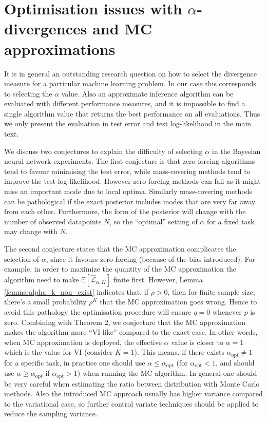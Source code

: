 \section{Optimisation issues with $\alpha$-divergences and MC approximations}
\label{sec:opt}

It is in general an outstanding research question on how to select the divergence measure for a particular machine learning problem. In our case this corresponds to selecting the $\alpha$ value. Also an approximate inference algorithm can be evaluated with different performance measures, and it is impossible to find a single algorithm value that returns the best performance on all evaluations. Thus we only present the evaluation in test error and test log-likelihood in the main text. 

We discuss two conjectures to explain the difficulty of selecting $\alpha$ in the Bayesian neural network experiments. The first conjecture is that zero-forcing algorithms tend to favour minimising the test error, while mass-covering methods tend to improve the test log-likelihood. However zero-forcing methods can fail as it might miss an important mode due to local optima. Similarly mass-covering methods can be pathological if the exact posterior includes modes that are very far away from each other. Furthermore, the form of the posterior will change with the number of observed datapoints $N$, so the ``optimal'' setting of $\alpha$ for a fixed task may change with $N$. 

The second conjecture states that the MC approximation complicates the selection of $\alpha$, since it favours zero-forcing (because of the bias introduced). For example, in order to maximize the quantity of the MC approximation the algorithm need to make $\mathbb{E}[\hat{\mathcal{L}}_{\alpha, K}]$ finite first. However, Lemma \ref{lemma:alpha_k_non_exist} indicates that, if $\rho > 0$, then for finite sample size, there's a small probability $\rho^K$ that the MC approximation goes wrong. Hence to avoid this pathology the optimisation procedure will ensure $q = 0$ whenever $p$ is zero. Combining with Theorem 2, we conjecture that the MC approximation makes the algorithm more ``VI-like'' compared to the exact case. In other words, when MC approximation is deployed, the effective $\alpha$ value is closer to $\alpha = 1$ which is the value for VI (consider $K = 1$). This means, if there exists $\alpha_{\text{opt}} \neq 1$ for a specific task, in practice one should use $\alpha \leq \alpha_{\text{opt}}$ (for $\alpha_{\text{opt}} < 1$, and should use $\alpha \geq \alpha_{\text{opt}}$ if $\alpha_{\text{opt}} > 1$) when running the MC algorithm. In general one should be very careful when estimating the ratio between distribution with Monte Carlo methods. Also the introduced MC approach usually has higher variance compared to the variational case, so further control variate techniques should be applied to reduce the sampling variance.

